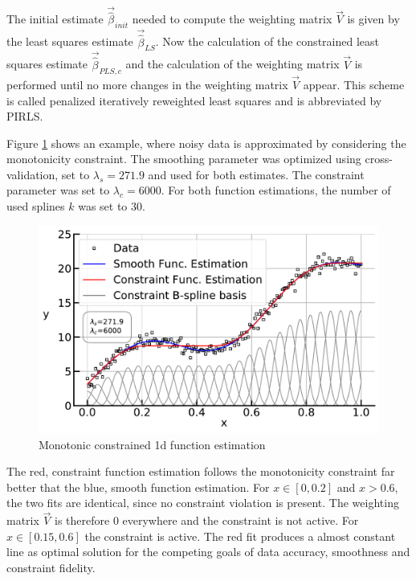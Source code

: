 \documentclass[10pt,a4paper]{article}
\begin{document}
	The initial estimate $\vec{\hat{\beta}}_{init}$ needed to compute the weighting matrix $\vec{V}$ is given by the least squares estimate $\vec{\hat{\beta}}_{LS}$. Now the calculation of the constrained least squares estimate $\vec{\hat{\beta}}_{PLS,c}$ and the calculation of the weighting matrix $\vec{V}$ is performed until no more changes in the weighting matrix $\vec{V}$ appear. This scheme is called penalized iteratively reweighted least squares and is abbreviated by PIRLS. \cite{hofner2011monotonicity}
	
	
	Figure \ref{fig:incspline} shows an example, where noisy data is approximated by considering the monotonicity constraint. The smoothing parameter was optimized using cross-validation, set to $\lambda_s=271.9$ and used for both estimates. The constraint parameter was set to $\lambda_c = 6000$. For both function estimations, the number of used splines $k$ was set to $30$. 	
	
	\begin{figure}[H]
		\centering
		\includegraphics[width=\linewidth]{../thesisplots/inc_spline.pdf}
		\caption{Monotonic constrained 1d function estimation}
		\label{fig:incspline}
	\end{figure}	

	The red, constraint function estimation follows the monotonicity constraint far better that the blue, smooth function estimation. For $x \in [0, 0.2]$ and $x > 0.6$, the two fits are identical, since no constraint violation is present. The weighting matrix $\vec{V}$ is therefore $0$ everywhere and the constraint is not active. For $x \in [0.15, 0.6]$ the constraint is active. The red fit produces a almost constant line as optimal solution for the competing goals of data accuracy, smoothness and constraint fidelity.
\end{document}
